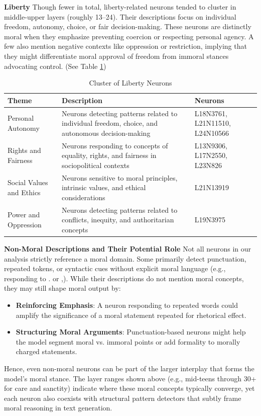 \documentclass[runninghheads]{llncs}
\begin{document}
\textbf{Liberty} Though fewer in total, liberty-related neurons tended to cluster in middle-upper layers (roughly 13–24). Their descriptions focus on individual freedom, autonomy, choice, or fair decision-making. These neurons are distinctly moral when they emphasize preventing coercion or respecting personal agency. A few also mention negative contexts like oppression or restriction, implying that they might differentiate moral approval of freedom from immoral stances advocating control. (See Table \ref{tab:liberty})

\begin{table}[H]
    \centering
    \caption{Cluster of Liberty Neurons}
    \begin{tabular}{|p{3cm}|p{5.5cm}|p{3.5cm}|}
    \hline
        \textbf{Theme} & \textbf{Description} & \textbf{Neurons} \\ \hline
        Personal Autonomy & Neurons detecting patterns related to individual freedom, choice, and autonomous decision-making & L18N3761, L21N11510, L24N10566 \\ \hline
        Rights and Fairness & Neurons responding to concepts of equality, rights, and fairness in sociopolitical contexts & L13N9306, L17N2550, L23N826 \\ \hline
        Social Values and Ethics & Neurons sensitive to moral principles, intrinsic values, and ethical considerations & L21N13919 \\ \hline
        Power and Oppression & Neurons detecting patterns related to conflicts, inequity, and authoritarian concepts & L19N3975 \\ \hline
    \end{tabular}
    \label{tab:liberty}
\end{table}

\textbf{Non-Moral Descriptions and Their Potential Role}
Not all neurons in our analysis strictly reference a moral domain. Some  primarily detect punctuation, repeated tokens, or syntactic cues without explicit moral language (e.g., responding to . or ,). While their descriptions do not mention moral concepts, they may still shape moral output by:
\begin{itemize}
    \item \textbf{Reinforcing Emphasis}: A neuron responding to repeated words could amplify the significance of a moral statement repeated for rhetorical effect.
    \item \textbf{Structuring Moral Arguments}: Punctuation-based neurons might help the model segment moral vs. immoral points or add formality to morally charged statements.
\end{itemize}
Hence, even non-moral neurons can be part of the larger interplay that forms the model’s moral stance. The layer ranges shown above (e.g., mid-teens through 30+ for care and sanctity) indicate where these moral concepts typically converge, yet each neuron also coexists with structural pattern detectors that subtly frame moral reasoning in text generation.
\end{document}
